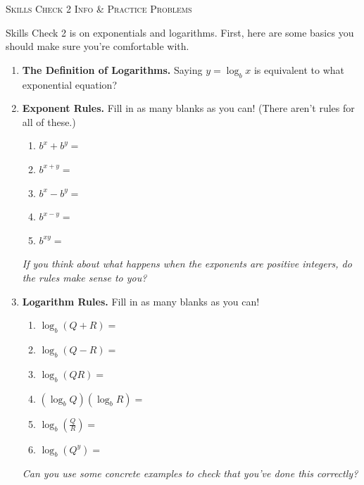 \documentclass{article}
\theoremstyle{theorem}
\begin{document}
\begin{center}
  \Large\textsc{Skills Check 2 Info \& Practice Problems}
\end{center}

\begin{problemonly}
  Skills Check 2 is on exponentials and logarithms. First, here are some basics you should make sure you're comfortable with.

  \begin{enumerate}

  \item \textbf{The Definition of Logarithms.} Saying $y = \log_b x$ is equivalent to what exponential equation?

    \pspace{0.5in}

  \item \textbf{Exponent Rules.} Fill in as many blanks as you can! (There aren't rules for all of these.) 
    \begin{enumerate}
    \item $b^x + b^y = {}$ \fitb{1in}{}
    \item $b^{x + y} = {}$ 
    \item $b^x - b^y = {}$ \fitb{1in}{}
    \item $b^{x - y} = {}$ 
    \item $b^{xy} = {}$ 
    \end{enumerate}

    \emph{If you think about what happens when the exponents are positive integers, do the rules make sense to you?}

  \item \textbf{Logarithm Rules.} Fill in as many blanks as you can!
    \begin{enumerate}
    \item $\log_b (Q + R) = {}$ \fitb{1in}{}
    \item $\log_b (Q - R) = {}$ \fitb{1in}{}
    \item $\log_b (QR) = {}$ 
    \item $(\log_b Q) (\log_b R) = {}$ \fitb{1in}{}
    \item $\log_b \left( \frac{Q}{R} \right) = {}$ 
    \item $\log_b (Q^y) = {}$ 
    \end{enumerate}

    \emph{Can you use some concrete examples to check that you've done this correctly?}


\end{enumerate}
\end{problemonly}
\end{document}
